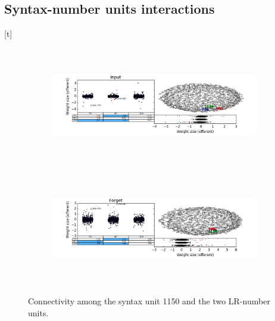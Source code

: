 \subsection{Syntax-number units interactions}[t]

\begin{figure}[t!]
    \centering
    \begin{subfigure}{\textwidth}
            \centering
            \includegraphics[width=\textwidth, height=5cm]{Figures/gate_Input_interactions.png}
    \label{fig:fig1}
    \end{subfigure}
\begin{subfigure}{\textwidth}
            \centering
            \includegraphics[width=\textwidth, height=5cm]{Figures/gate_Forget_interactions.png}
    \label{fig:fig2}
    \end{subfigure}
\caption{Connectivity among the syntax unit 1150 and the two LR-number units.}
\end{figure}



